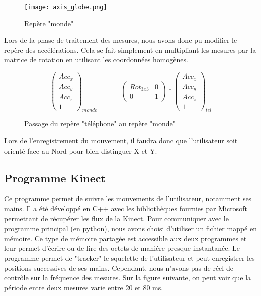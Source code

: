 \documentclass[12pt, french]{article}
\begin{document}
\begin{figure}[H]
\centering
\texttt{[image: axis\_globe.png]}
\caption{Repère "monde"}
\label{fig2}
\end{figure}

Lors de la phase de traitement des mesures, nous avons donc pu modifier le repère des accélérations. Cela se fait simplement en multipliant les mesures par la matrice de rotation en utilisant les coordonnées homogènes. 
\begin{figure}[H]
\[\left( 
\begin{array}{c}
Acc_x  \\
Acc_y  \\
Acc_z  \\
1 \end{array} 
\right)_{monde}=\qquad
\left( 
\begin{array}{cc}
Rot_{3x3} & 0  \\
0 & 1  \end{array} 
\right)*\left( 
\begin{array}{c}
Acc_x  \\
Acc_y  \\
Acc_z  \\
1\end{array} 
\right)_{tel}\]
\caption{Passage du repère "téléphone" au repère "monde"}
\end{figure}

Lors de l'enregistrement du mouvement, il faudra donc que l'utilisateur soit orienté face au Nord pour bien distinguer X et Y.




\subsection{Programme Kinect}
Ce programme permet de suivre les mouvements de l'utilisateur, notamment ses mains. Il a été développé en C++ avec les bibliothèques fournies par Microsoft permettant de récupérer les flux de la Kinect.
Pour communiquer avec le programme principal (en python), nous avons choisi d'utiliser un fichier mappé en mémoire. Ce type de mémoire partagée est accessible aux deux programmes et leur permet d'écrire ou de lire des octets de maniére presque instantanée. Le programme permet de "tracker" le squelette de l'utilisateur et peut enregistrer les positions successives de ses mains. Cependant, nous n'avons pas de réel de contrôle sur la fréquence des mesures. Sur la figure suivante, on peut voir que la période entre deux mesures varie entre 20 et 80 ms.
\end{document}
